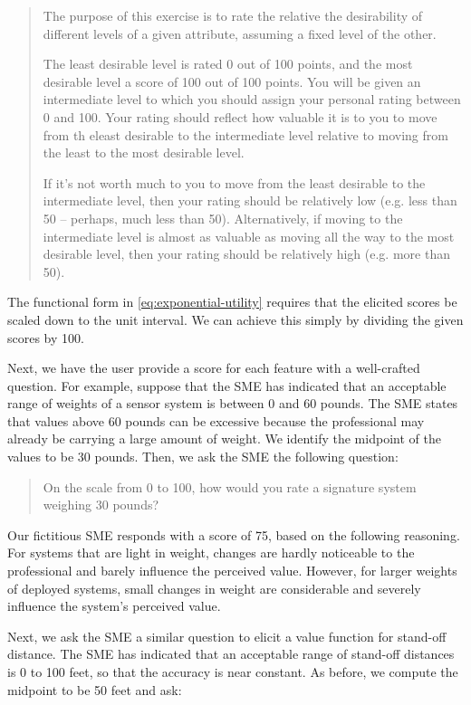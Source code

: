 \documentclass{article}
\begin{document}
\begin{quote}
  The purpose of this exercise is to rate the relative the desirability of
  different levels of a given attribute, assuming a fixed level of the other.

  The least desirable level is rated 0 out of 100 points, and the most desirable
  level a score of 100 out of 100 points. You will be given an intermediate level
  to which you should assign your personal rating between 0 and 100. Your rating
  should reflect how valuable it is to you to move from th eleast desirable to
  the intermediate level relative to moving from the least to the most desirable
  level.

  If it's not worth much to you to move from the least desirable to the
  intermediate level, then your rating should be relatively low (e.g. less than
  50 -- perhaps, much less than 50). Alternatively, if moving to the intermediate
  level is almost as valuable as moving all the way to the most desirable level,
  then your rating should be relatively high (e.g. more than 50).
\end{quote}

The functional form in \eqref{eq:exponential-utility} requires that the elicited
scores be scaled down to the unit interval. We can achieve this simply by
dividing the given scores by 100.

Next, we have the user provide a score for each feature with a well-crafted
question. For example, suppose that the SME has indicated that an acceptable
range of weights of a sensor system is between 0 and 60 pounds. The SME states
that values above 60 pounds can be excessive because the professional may already
be carrying a large amount of weight. We identify the midpoint of the values
to be 30 pounds. Then, we ask the SME the following question:

\begin{quote}
  On the scale from 0 to 100, how would you rate a signature system weighing 30
  pounds?
\end{quote}




Our fictitious SME responds with a score of 75, based on
the following reasoning. For systems that are light in weight, changes are hardly
noticeable to the professional and barely influence the perceived value. However,
for larger weights of deployed systems, small changes in weight are considerable
and severely influence the system's perceived value.

Next, we ask the SME a similar question to elicit a value function for stand-off
distance. The SME has indicated that an acceptable range of stand-off distances is
0 to 100 feet, so that the accuracy is near constant. As before, we compute the
midpoint to be 50 feet and ask:
\end{document}
